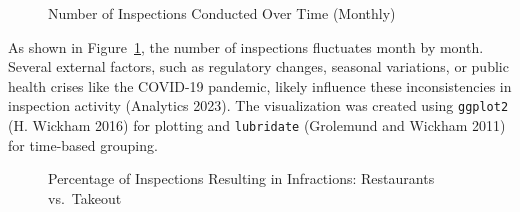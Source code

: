 \documentclass[
  letterpaper,
  DIV=11,
  numbers=noendperiod]{scrartcl}
\begin{document}
\begin{figure}


\caption{\label{fig-inspections-over-time}Number of Inspections
Conducted Over Time (Monthly)}

\end{figure}%

As shown in Figure~\ref{fig-inspections-over-time}, the number of
inspections fluctuates month by month. Several external factors, such as
regulatory changes, seasonal variations, or public health crises like
the COVID-19 pandemic, likely influence these inconsistencies in
inspection activity (Analytics 2023). The visualization was created
using \texttt{ggplot2} (H. Wickham 2016) for plotting and
\texttt{lubridate} (Grolemund and Wickham 2011) for time-based grouping.

\newpage

\begin{figure}


\caption{\label{fig-restaurant-vs-takeout}Percentage of Inspections
Resulting in Infractions: Restaurants vs.~Takeout}

\end{figure}%
\end{document}
